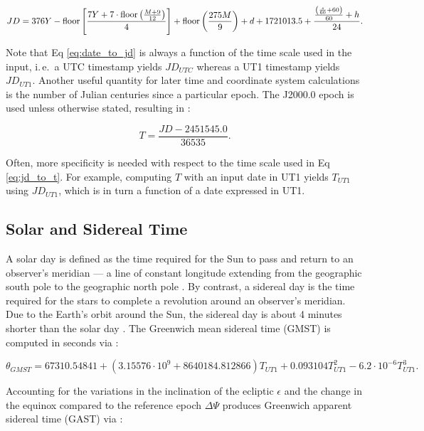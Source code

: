 \begin{equation} \label{eq:date_to_jd}
  JD = 376Y - \operatorname{floor}{\left[ \frac{7Y + 7 \cdot \operatorname{floor}{\left(\frac{M + 9}{12} \right)}}{4} \right]}
      + \operatorname{floor}{\left(\frac{275M}{9}\right)} 
      + d
      + 1721013.5
      + \frac{\frac{\left(\frac{s}{60} + 60\right)}{60} + h}{24}.
\end{equation}

Note that Eq \ref{eq:date_to_jd} is always a function of the time scale used in the input, i.\,e.\, a UTC timestamp yields $JD_{UTC}$ whereas a UT1 timestamp yields $JD_{UT1}$. Another useful quantity for later time and coordinate system calculations is the number of Julian centuries since a particular epoch. The J2000.0 epoch is used unless otherwise stated, resulting in \cite{vallado4ed}:

\begin{equation} \label{eq:jd_to_t}
  T = \frac{JD - 2451545.0}{36535}.
\end{equation}

Often, more specificity is needed with respect to the time scale used in Eq \ref{eq:jd_to_t}. For example, computing $T$ with an input date in UT1 yields $T_{UT1}$ using $JD_{UT1}$, which is in turn a function of a date expressed in UT1. 

\subsection{Solar and Sidereal Time}

A solar day is defined as the time required for the Sun to pass and return to an observer's meridian --- a line of constant longitude extending from the geographic south pole to the geographic north pole \cite{vallado4ed}. By contrast, a sidereal day is the time required for the stars to complete a revolution around an observer's meridian. Due to the Earth's orbit around the Sun, the sidereal day is about 4 minutes shorter than the solar day \cite{vallado4ed}. The Greenwich mean sidereal time (GMST) is computed in seconds via \cite{frueh2019notes}:

\begin{equation} \label{eq:date_to_gmst}
  \theta_{GMST} = 67310.54841
        + \left(3.15576 \cdot 10^9 + 8640184.812866 \right) T_{UT1}
        + 0.093104 T_{UT1}^2
        - 6.2 \cdot 10^{-6} T_{UT1}^3.
\end{equation}

Accounting for the variations in the inclination of the ecliptic $\epsilon$ and the change in the equinox compared to the reference epoch $\Delta \Psi$ produces Greenwich apparent sidereal time (GAST) via \cite{frueh2019notes}:


